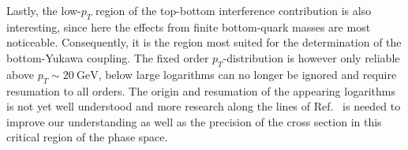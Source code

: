 Lastly, the low-$p_T$ region of the top-bottom interference contribution is also interesting, since here the effects from finite bottom-quark masses are most noticeable. Consequently, it is the region most suited for the determination of the bottom-Yukawa coupling. The fixed order $p_T$-distribution is however only reliable above $p_T \sim 20 \ \mathrm{GeV}$, below large logarithms can no longer be ignored and require resumation to all orders. The origin and resumation of the appearing logarithms is not yet well understood and more research along the lines of Ref.~\cite{Caola:2018zye} is needed to improve our understanding as well as the precision of the cross section in this critical region of the phase space.
